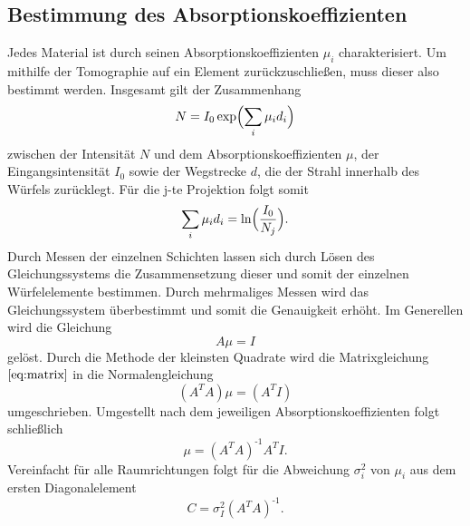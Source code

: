 \subsection{Bestimmung des Absorptionskoeffizienten}
Jedes Material ist durch seinen Absorptionskoeffizienten $\mu_i$ charakterisiert.
Um mithilfe der Tomographie auf ein Element zurückzuschließen, muss dieser also bestimmt werden.
Insgesamt gilt der Zusammenhang
\begin{equation}
  N=I_0 \exp \Bigl(\sum_{i}\mu_i d_i\Bigr)
\end{equation}
zwischen der Intensität $N$ und dem Absorptionskoeffizienten $\mu$, der Eingangsintensität $I_0$ sowie der Wegstrecke $d$, die der Strahl innerhalb des Würfels zurücklegt.
Für die j-te Projektion folgt somit
\begin{equation}
  \sum_{i}\mu_i d_i =\ln \Bigl(\frac{I_0}{N_j}\Bigr).
\end{equation}
Durch Messen der einzelnen Schichten lassen sich durch Lösen des Gleichungssystems die Zusammensetzung dieser und somit der einzelnen Würfelelemente bestimmen.
Durch mehrmaliges Messen wird das Gleichungssystem überbestimmt und somit die Genauigkeit erhöht.
Im Generellen wird die Gleichung
\begin{equation}
  A \mu = I
  \label{eq:matrix}
\end{equation}
gelöst.
Durch die Methode der kleinsten Quadrate wird die Matrixgleichung $\ref{eq:matrix}$ in die Normalengleichung
\begin{equation}
  (A^TA)\mu = (A^T I)
\end{equation}
umgeschrieben.
Umgestellt nach dem jeweiligen Absorptionskoeffizienten folgt schließlich
\begin{equation}
  \mu = (A^T A)^\text{-1}A^TI.
\end{equation}
Vereinfacht für alle Raumrichtungen folgt für die Abweichung $\sigma_i^2$ von $\mu_i$ aus dem ersten Diagonalelement
\begin{equation}
  C=\sigma_I^2(A^TA)^\text{-1}.
  \label{eq:abweichung}
\end{equation}
\clearpage
